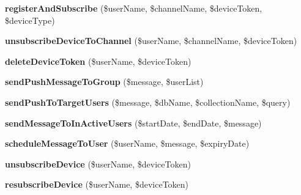 \begin{DoxyCompactItemize}
\item 
\hypertarget{class_push_notification_service_a39cca8fbf10c5f8aded7817189b28610}{{\bfseries register\+And\+Subscribe} (\$user\+Name, \$channel\+Name, \$device\+Token, \$device\+Type)}\label{class_push_notification_service_a39cca8fbf10c5f8aded7817189b28610}

\item 
\hypertarget{class_push_notification_service_aa0f03ad6091587a9effe23917ba2ad47}{{\bfseries unsubscribe\+Device\+To\+Channel} (\$user\+Name, \$channel\+Name, \$device\+Token)}\label{class_push_notification_service_aa0f03ad6091587a9effe23917ba2ad47}

\item 
\hypertarget{class_push_notification_service_a2659708b36df34f8494620014606b456}{{\bfseries delete\+Device\+Token} (\$user\+Name, \$device\+Token)}\label{class_push_notification_service_a2659708b36df34f8494620014606b456}

\item 
\hypertarget{class_push_notification_service_a69f2ea6c31f1287810cb0cc7ca124e85}{{\bfseries send\+Push\+Message\+To\+Group} (\$message, \$user\+List)}\label{class_push_notification_service_a69f2ea6c31f1287810cb0cc7ca124e85}

\item 
\hypertarget{class_push_notification_service_aec41d8eb5d76870ff73c068510e9c157}{{\bfseries send\+Push\+To\+Target\+Users} (\$message, \$db\+Name, \$collection\+Name, \$query)}\label{class_push_notification_service_aec41d8eb5d76870ff73c068510e9c157}

\item 
\hypertarget{class_push_notification_service_a584459b23d4b989f143def9c2c88225e}{{\bfseries send\+Message\+To\+In\+Active\+Users} (\$start\+Date, \$end\+Date, \$message)}\label{class_push_notification_service_a584459b23d4b989f143def9c2c88225e}

\item 
\hypertarget{class_push_notification_service_a251d5b75e3c81fa577a45e08182c7c9b}{{\bfseries schedule\+Message\+To\+User} (\$user\+Name, \$message, \$expiry\+Date)}\label{class_push_notification_service_a251d5b75e3c81fa577a45e08182c7c9b}

\item 
\hypertarget{class_push_notification_service_a2a4c629a4ecc4b2fb94074526222a106}{{\bfseries unsubscribe\+Device} (\$user\+Name, \$device\+Token)}\label{class_push_notification_service_a2a4c629a4ecc4b2fb94074526222a106}

\item 
\hypertarget{class_push_notification_service_ab3e28c15c3bbaa49b6e434639068cd2f}{{\bfseries resubscribe\+Device} (\$user\+Name, \$device\+Token)}\label{class_push_notification_service_ab3e28c15c3bbaa49b6e434639068cd2f}


\end{DoxyCompactItemize}
